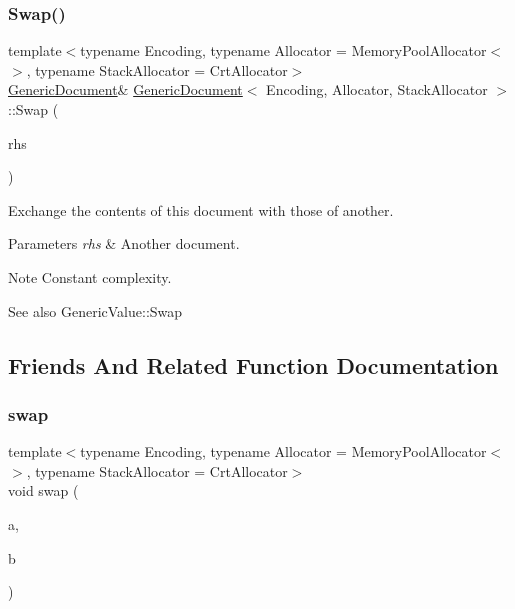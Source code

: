 \subsubsection{\texorpdfstring{Swap()}{Swap()}}
{\footnotesize\ttfamily template$<$typename Encoding, typename Allocator = Memory\+Pool\+Allocator$<$$>$, typename Stack\+Allocator = Crt\+Allocator$>$ \\
\hyperlink{a01996}{Generic\+Document}\& \hyperlink{a01996}{Generic\+Document}$<$ Encoding, Allocator, Stack\+Allocator $>$\+::Swap (\begin{DoxyParamCaption}\item[{\hyperlink{a01996}{Generic\+Document}$<$ Encoding, Allocator, Stack\+Allocator $>$ \&}]{rhs }\end{DoxyParamCaption})\hspace{0.3cm}{\ttfamily [inline]}}



Exchange the contents of this document with those of another. 


\begin{DoxyParams}{Parameters}
{\em rhs} & Another document. \\
\hline
\end{DoxyParams}
\begin{DoxyNote}{Note}
Constant complexity. 
\end{DoxyNote}
\begin{DoxySeeAlso}{See also}
Generic\+Value\+::\+Swap 
\end{DoxySeeAlso}


\subsection{Friends And Related Function Documentation}
\mbox{\label{a01996_a0d63efcc43758ac3aed77e868233369d}} 
\subsubsection{\texorpdfstring{swap}{swap}}
{\footnotesize\ttfamily template$<$typename Encoding, typename Allocator = Memory\+Pool\+Allocator$<$$>$, typename Stack\+Allocator = Crt\+Allocator$>$ \\
void swap (\begin{DoxyParamCaption}\item[{\hyperlink{a01996}{Generic\+Document}$<$ Encoding, Allocator, Stack\+Allocator $>$ \&}]{a,  }\item[{\hyperlink{a01996}{Generic\+Document}$<$ Encoding, Allocator, Stack\+Allocator $>$ \&}]{b }\end{DoxyParamCaption})\hspace{0.3cm}{\ttfamily [friend]}}



